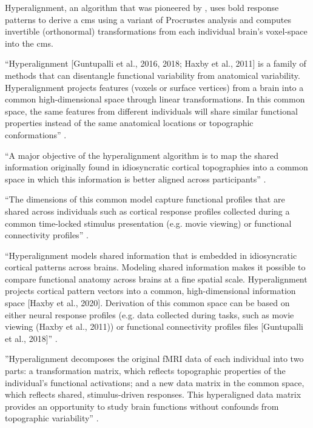 
%
Hyperalignment, an algorithm that was pioneered by \citet{haxby2011common}, uses
\ac{bold} response patterns to derive a \ac{cms} using a variant of Procrustes
analysis and computes invertible (orthonormal) transformations from each
individual brain's voxel-space into the \ac{cms}.

%
``Hyperalignment [Guntupalli et al., 2016, 2018; Haxby et al., 2011] is a family
of methods that can disentangle functional variability from anatomical
variability. Hyperalignment projects features (voxels or surface vertices) from
a brain into a common high-dimensional space through linear transformations. In
this common space, the same features from different individuals will share
similar functional properties instead of the same anatomical locations or
topographic conformations'' \citep{feilong2018reliable}.

%
``A major objective of the hyperalignment algorithm is to map the shared
information originally found in idiosyncratic cortical topographies into a
common space in which this information is better aligned across participants''
\citep{busch2021hybrid}.

%
``The dimensions of this common model capture functional profiles that are
shared across individuals such as cortical response profiles collected during a
common time-locked stimulus presentation (e.g. movie viewing) or functional
connectivity profiles'' \citep{busch2021hybrid}.

%
``Hyperalignment models shared information that is embedded in idiosyncratic
cortical patterns across brains. Modeling shared information makes it possible
to compare functional anatomy across brains at a fine spatial scale.
Hyperalignment projects cortical pattern vectors into a common, high-dimensional
information space [Haxby et al., 2020]. Derivation of this common space can be
based on either neural response profiles (e.g. data collected during tasks, such
as movie viewing (Haxby et al., 2011)) or functional connectivity profiles files
[Guntupalli et al., 2018]'' \citep{busch2021hybrid}.

%
''Hyperalignment decomposes the original fMRI data of
each individual into two parts: a transformation matrix, which reflects
topographic properties of the individual's functional activations; and a new
data matrix in the common space, which reflects shared, stimulus-driven
responses. This hyperaligned data matrix provides an opportunity to study brain
functions without confounds from topographic variability''
\citep{feilong2018reliable}.

